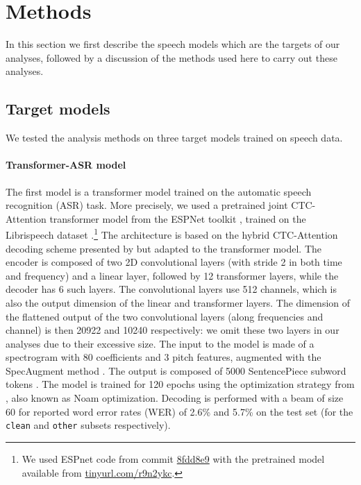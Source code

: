 \section{Methods}
\label{sec:methods}
In this section we first describe the speech models which are the
targets of our analyses, followed by a discussion of the methods used
here to carry out these analyses.  


\subsection{Target models}
We tested the analysis methods on three target models trained on speech
data.
\label{sec:target_models}
\paragraph{Transformer-ASR model}
\label{sec:trans-asr}
The first model is a transformer model
\citep{vaswani_attention_2017} trained on the automatic speech
recognition (ASR)
task. More precisely, we used a pretrained joint CTC-Attention
transformer model from the ESPNet toolkit \citep{watanabe2018espnet},
trained on the Librispeech dataset
\citep{panayotov_librispeech:_2015}.\footnote{We used ESPnet code from
  commit
  \href{https://github.com/espnet/espnet/commit/8fdd8e96b0896d97a63ab74ceb1cbc01c7652778}{8fdd8e9}
  with the pretrained model available from
  \href{https://tinyurl.com/r9n2ykc}{tinyurl.com/r9n2ykc}.}
The architecture is based on the hybrid CTC-Attention decoding scheme
presented by \citet{watanabe_hybrid_2017} but adapted to the transformer
model. The encoder is composed of two 2D convolutional layers
(with stride 2 in both time and frequency) and a linear layer,
followed by 12 transformer layers, while the decoder has 6 such
layers. The convolutional layers use 512 channels, which is also the
output dimension of the linear and transformer layers. The dimension
of the flattened output of
the two convolutional layers (along frequencies and channel) is then
20922 and 10240 respectively: we omit these two layers in our analyses
due to their excessive size.
The input to the model is made of a spectrogram with 80 coefficients
and 3 pitch features, augmented with the
SpecAugment method \citep{Park2019}. The output is
composed of 5000 SentencePiece subword tokens
\citep{kudo-richardson-2018-sentencepiece}. The model is trained for 120 epochs
using the optimization strategy from
\citet{vaswani_attention_2017}, also known as Noam optimization.
Decoding is performed with a beam of
size 60 for reported word error rates (WER) of 2.6\% and 5.7\% on the test
set (for the \texttt{clean} and \texttt{other} subsets respectively).

